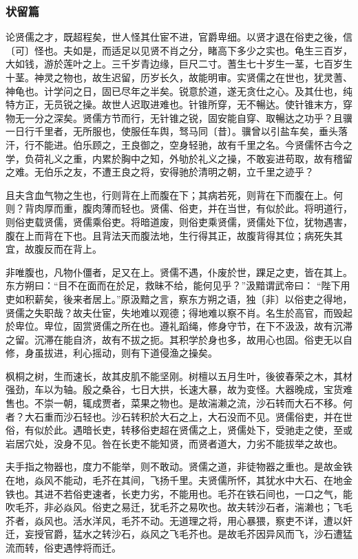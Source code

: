 \documentclass[]{article}
\begin{document}
\hypertarget{header-n585}{%
\subsubsection{状留篇}\label{header-n585}}

论贤儒之才，既超程矣，世人怪其仕宦不进，官爵卑细。以贤才退在俗吏之後，信〔可〕怪也。夫如是，而适足以见贤不肖之分，睹高下多少之实也。龟生三百岁，大如钱，游於莲叶之上。三千岁青边缘，巨尺二寸。蓍生七十岁生一茎，七百岁生十茎。神灵之物也，故生迟留，历岁长久，故能明审。实贤儒之在世也，犹灵蓍、神龟也。计学问之日，固已尽年之半矣。锐意於道，遂无贪仕之心。及其仕也，纯特方正，无员锐之操。故世人迟取进难也。针锥所穿，无不暢达。使针锥末方，穿物无一分之深矣。贤儒方节而行，无针锥之锐，固安能自穿、取暢达之功乎？且骥一日行千里者，无所服也，使服任车舆，驽马同〔昔〕。骥曾以引盐车矣，垂头落汗，行不能进。伯乐顾之，王良御之，空身轻驰，故有千里之名。今贤儒怀古今之学，负荷礼义之重，内累於胸中之知，外劬於礼义之操，不敢妄进苟取，故有稽留之难。无伯乐之友，不遭王良之将，安得驰於清明之朝，立千里之迹乎？

且夫含血气物之生也，行则背在上而腹在下；其病若死，则背在下而腹在上。何则？背肉厚而重，腹肉薄而轻也。贤儒、俗吏，并在当世，有似於此。将明道行，则俗吏载贤儒，贤儒乘俗吏。将暗道废，则俗吏乘贤儒，贤儒处下位，犹物遇害，腹在上而背在下也。且背法天而腹法地，生行得其正，故腹背得其位；病死失其宜，故腹反而在背上。

非唯腹也，凡物仆僵者，足又在上。贤儒不遇，仆废於世，踝足之吏，皆在其上。东方朔曰：``目不在面而在於足，救昧不给，能何见乎？''汲黯谓武帝曰：
``陛下用吏如积薪矣，後来者居上。''原汲黯之言，察东方朔之语，独〔非〕以俗吏之得地，贤儒之失职哉？故夫仕宦，失地难以观德；得地难以察不肖。名生於高官，而毁起於卑位。卑位，固赏贤儒之所在也。遵礼蹈绳，修身守节，在下不汲汲，故有沉滞之留。沉滞在能自济，故有不拔之扼。其积学於身也多，故用心也固。俗吏无以自修，身虽拔进，利心摇动，则有下道侵渔之操矣。

枫桐之树，生而速长，故其皮肌不能坚刚。树檀以五月生叶，後彼春荣之木，其材强劲，车以为轴。殷之桑谷，七日大拱，长速大暴，故为变怪。大器晚成，宝货难售也。不崇一朝，辄成贾者，菜果之物也。是故湍濑之流，沙石转而大石不移。何者？大石重而沙石轻也。沙石转积於大石之上，大石没而不见。贤儒俗吏，并在世俗，有似於此。遇暗长吏，转移俗吏超在贤儒之上，贤儒处下，受驰走之使，至或岩居穴处，没身不见。咎在长吏不能知贤，而贤者道大，力劣不能拔举之故也。

夫手指之物器也，度力不能举，则不敢动。贤儒之道，非徒物器之重也。是故金铁在地，焱风不能动，毛芥在其间，飞扬千里。夫贤儒所怀，其犹水中大石、在地金铁也。其进不若俗吏速者，长吏力劣，不能用也。毛芥在铁石间也，一口之气，能吹毛芥，非必焱风。俗吏之易迁，犹毛芥之易吹也。故夫转沙石者，湍濑也；飞毛芥者，焱风也。活水洋风，毛芥不动。无道理之将，用心暴猥，察吏不详，遭以奸迁，妄授官爵，猛水之转沙石，焱风之飞毛芥也。是故毛芥因异风而飞，沙石遭猛流而转，俗吏遇悖将而迁。
\end{document}
